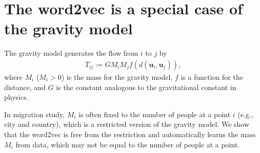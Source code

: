 \documentclass[12pt]{article} %
\def\vec#1{{\bm #1}}
\begin{document}
\section{The word2vec is a special case of the gravity model}

The gravity model generates the flow from $i$ to $j$ by 
\begin{align}
    \label{eq:gravity_model}
    T_{ij}:= G M_i M_j f\left(d(\vec{u}_i,\vec{u}_j)\right),
\end{align}
where $M_i$ ($M_i>0$) is the mass for the gravity model, $f$ is a function for the distance, and 
$G$ is the constant analogous to the gravitational constant in physics.  

In migration study, $M_i$ is often fixed to the number of people at a point $i$ (e.g., city and country), which is a restricted version of the gravity model.
We show that the word2vec is free from the restriction and automatically learns the mass $M_i$ from data, which may not be equal to the number of people at a point.
\end{document}

